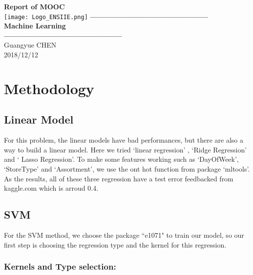 \documentclass[a4paper]{article}
\begin{document}
\hypersetup{pageanchor=false,
             bookmarksnumbered=true,
             pdfencoding=unicode
            }
\begin{titlepage}
\vspace*{7cm}
\begin{center}%
{\LARGE \textbf{Report of MOOC} }\\
\vskip 1cm
\texttt{[image: Logo\_ENSIIE.png]}
\vskip 1cm
{\Huge \textbf{---------------------------------------------} }\\
\vskip 0.5cm
{\Huge \textbf{Machine Learning} }\\
\vskip 0.5cm
{\Huge \textbf{---------------------------------------------} }\\
\vskip 1cm
\vspace*{1cm}
{\large Guangyue CHEN}\\
\vspace*{0.5cm}
{\large{2018/12/12}}
\end{center}
\end{titlepage}
\tableofcontents{\LARGE}
\hypersetup{pageanchor=true}


\newpage
\section{\textbf{Methodology}}

\subsection{Linear Model}

For this problem, the linear models have bad performances, but there are also a way to build a linear model. Here we tried `linear regression' , `Ridge Regression' and ` Lasso Regression'. To make some features working such as `DayOfWeek', `StoreType' and `Assortment', we use the ont hot function from package `mltools'. As the results,  all of these three regression have a test error feedbacked from kaggle.com which is arroud 0.4. 

\subsection{\textbf{SVM}}

	For the SVM method, we choose the package ``e1071" to train our model, so our first step is choosing the regression type and the kernel for this regression. 

	\subsubsection{Kernels and Type selection:}
\end{document}
